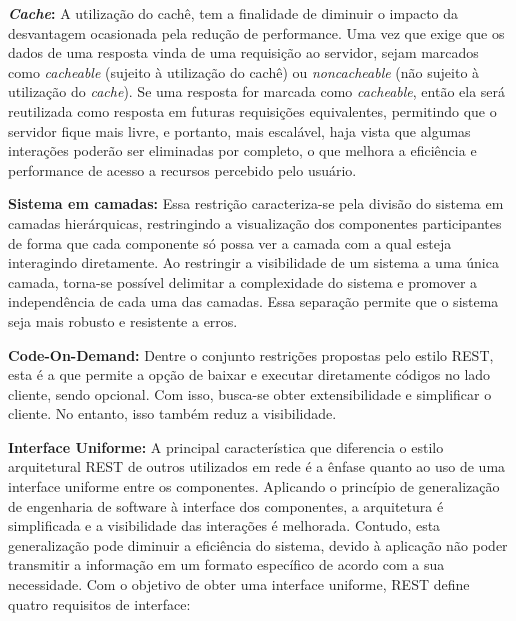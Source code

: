 \textbf{\emph{Cache}:} A utilização do cachê, tem  a finalidade de diminuir o impacto da desvantagem ocasionada pela redução de performance. Uma vez que exige que os dados de uma resposta vinda de uma requisição ao servidor, sejam marcados como \emph{cacheable} (sujeito à utilização do cachê) ou \emph{noncacheable} (não sujeito à utilização do \emph{cache}). Se uma resposta for marcada como \emph{cacheable}, então ela será reutilizada como resposta em futuras requisições equivalentes, permitindo que o servidor fique mais livre, e portanto, mais escalável, haja vista que algumas interações poderão ser eliminadas por completo, o que melhora a eficiência e performance de acesso a recursos percebido pelo usuário.

\textbf{Sistema em camadas:} Essa restrição caracteriza-se pela divisão do sistema em camadas hierárquicas, restringindo a visualização dos componentes participantes de forma que cada componente só possa ver a camada com a qual esteja interagindo diretamente. Ao restringir a visibilidade de um sistema a uma única camada, torna-se possível delimitar a complexidade do sistema e promover a independência de cada uma das camadas.  Essa separação permite que  o sistema seja mais robusto e resistente a erros.

\textbf{Code-On-Demand:} Dentre o conjunto restrições propostas pelo estilo REST, esta é a que permite a opção de baixar e executar diretamente códigos no lado cliente, sendo opcional. Com isso, busca-se  obter extensibilidade e simplificar  o cliente. No entanto, isso também reduz a visibilidade.

\textbf{Interface Uniforme:} A principal característica que diferencia o estilo arquitetural REST de outros utilizados em rede é a ênfase  quanto ao uso de uma interface uniforme entre os componentes. Aplicando o princípio de generalização de engenharia de software à interface dos componentes, a arquitetura é simplificada e a visibilidade das interações é melhorada. Contudo, esta generalização pode diminuir a eficiência do sistema, devido à aplicação não poder transmitir a informação em um formato específico de acordo com a sua  necessidade. Com o objetivo de obter uma interface uniforme, REST define quatro requisitos de interface:

